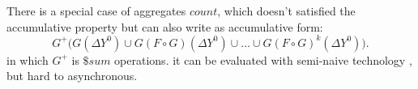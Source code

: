 {{	
There is a special case of aggregates $count$, which doesn't satisfied the accumulative property but can also write as accumulative form:
\begin{equation}
\label{eq:accumasyncres}
G^+\Big(G(\Delta Y^0)\cup G(F\circ G)(\Delta Y^0)\cup\ldots\cup G(F\circ G)^k(\Delta Y^0)\Big).
\end{equation}
in which $G^+$ is $\$sum$ operations. it can be evaluated with semi-naive technology , but hard to asynchronous.
}

}
